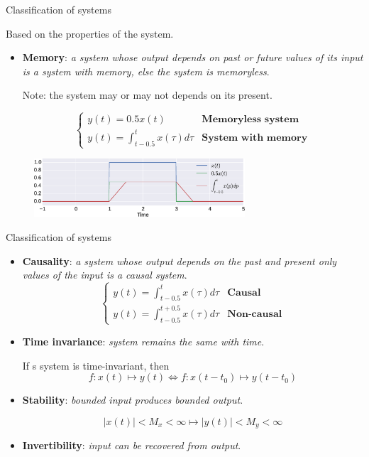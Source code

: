 \documentclass{beamer}
\begin{document}
\begin{frame}{Classification of systems}

Based on the properties of the system.

\begin{itemize}
\item \textbf{Memory}: \textit{a system whose output depends on past or future values of its input is a system with memory, else the system is memoryless}. 

Note: the system may or may not depends on its present.

\[ \begin{cases}
y(t) = 0.5x(t) & \mathrm{\textbf{Memoryless system}} \\
y(t) = \int_{t-0.5}^{t}x(\tau)d\tau & \mathrm{\textbf{System with memory}}
\end{cases}
\]
\end{itemize}

\begin{figure}
\includegraphics[width=0.7\textwidth]{img/memory.eps}
\end{figure}

\end{frame}

\begin{frame}{Classification of systems}

\begin{itemize}
\item \textbf{Causality}: \textit{a system whose output depends on the past and present only values of the input is a causal system}.
\[ \begin{cases}
y(t) = \int_{t-0.5}^{t}x(\tau)d\tau & \mathrm{\textbf{Causal}} \\
y(t) = \int_{t-0.5}^{t+0.5}x(\tau)d\tau & \mathrm{\textbf{Non-causal}}
\end{cases}
\]

\item \textbf{Time invariance}: \textit{system remains the same with time}.

If s system is time-invariant, then
\[ f:x\left(t\right) \mapsto y\left(t\right) \iff f:x\left(t-t_0\right) \mapsto y\left(t-t_0\right)\]

\item \textbf{Stability}: \textit{bounded input produces bounded output}.

\[ \left|x\left(t\right)\right| < M_x < \infty \mapsto \left|y\left(t\right)\right| < M_y < \infty \]

\item \textbf{Invertibility}: \textit{input can be recovered from output}.
\end{itemize}
\end{frame}
\end{document}
